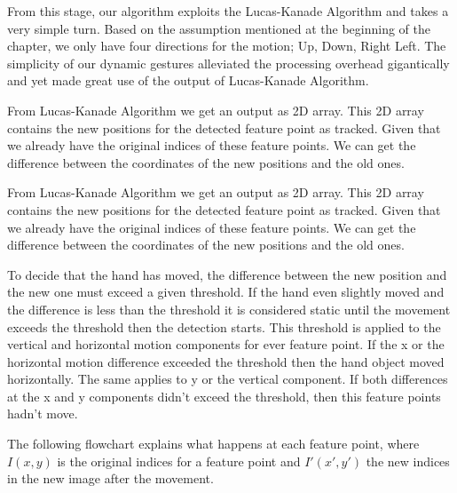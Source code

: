 From this stage, our algorithm exploits the Lucas-Kanade Algorithm and takes a very simple turn. Based on the assumption mentioned at the beginning of the chapter, we only have four directions for the motion; Up, Down, Right Left. The simplicity of our dynamic gestures alleviated the processing overhead gigantically and yet made great use of the output of Lucas-Kanade Algorithm.\bigskip

From Lucas-Kanade Algorithm we get an output as 2D array. This 2D array contains the new positions for the detected feature point as tracked. Given that we already have the original indices of these feature points. We can get the difference between the coordinates of the new positions and the old ones.\bigskip

From Lucas-Kanade Algorithm we get an output as 2D array. This 2D array contains the new positions for the detected feature point as tracked. Given that we already have the original indices of these feature points. We can get the difference between the coordinates of the new positions and the old ones.\bigskip

To decide that the hand has moved, the difference between the new position and the new one must exceed a given threshold. If the hand even slightly moved and the difference is less than the threshold it is considered static until the movement exceeds the threshold then the detection starts. This threshold is applied to the vertical and horizontal motion components for ever feature point. If the x or the horizontal motion difference exceeded the threshold then the hand object moved horizontally. The same applies to y or the vertical component. If both differences at the x and y components didn't exceed the threshold, then this feature points hadn't move.\bigskip


The following flowchart explains what happens at each feature point, where $I(x,y)$ is the original indices for a feature point and $I'(x',y')$ the new indices in the new image after the movement. \bigskip

\begin{figure}[h]
\end{figure}

